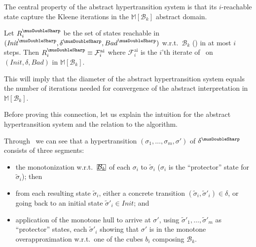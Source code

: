 \documentclass[acmsmall,screen]{acmart}
\newcommand{\Init}{{\textit{Init}}}
\newcommand{\Bad}{\textit{Bad}}
\newcommand{\tr}{\delta}
\newcommand{\Frameai}{\mathcal{F}^{\text{ai}}}
\newcommand{\bkwrch}[1]{\mathcal{B}_{#1}}
\newcommand{\absr}[1]{{#1}^{\musDoubleSharp}}
\newcommand{\madom}[1]{\mathbb{M}[{#1}]}
\newcommand{\bkcube}{b}
\newcommand\mathbox[1]{\mathord{\ThisStyle{%
  \fboxsep0\LMpt\relax\kern1\LMpt\fbox{$\SavedStyle#1$}\kern1\LMpt}}}
\newcommand{\cubejoin}[1]{\mathbox{#1}}
\begin{document}
The central property of the abstract hypertransition system is that its $i$-reachable state capture the Kleene iterations in the $\madom{\bkwrch{k}}$ abstract domain.
\begin{lemma}
\label{thm:hyperabsract-reach}
%
Let $\absr{R}_i$ be the set of states reachable in $(\absr{\Init},\absr{\tr},\absr{Bad})$ w.r.t.\ $\bkwrch{k}$ () in at most $i$ steps.
Then $\absr{R}_i \equiv \Frameai_{i}$ where $\Frameai_{i}$ is the $i$'th iterate of~ on $(\Init,\tr,\Bad)$ in $\madom{\bkwrch{k}}$.
%
%
\end{lemma}
%
%
This will imply that the diameter of the abstract hypertransition system equals the number of iterations needed for convergence of the abstract interpretation in $\madom{\bkwrch{k}}$.

Before proving this connection, let us explain the intuition for the abstract hypertransition system and the relation to the algorithm.

Through~ we can see that a hypertransition $(\sigma_1,\ldots,\sigma_m,\sigma')$ of $\absr{\tr}$ consists of three segments:
\begin{itemize}
	\item the monotonization w.r.t.\ $\cubejoin{\bkwrch{k}}$ of each $\sigma_i$ to $\widetilde{\sigma}_i$ ($\sigma_i$ is the ``protector'' state for $\widetilde{\sigma}_i$); then
	\item from each resulting state $\widetilde{\sigma}_i$, either a concrete transition $(\widetilde{\sigma}_i,\widetilde{\sigma}'_i) \in \tr$, or going back to an initial state $\widetilde{\sigma}'_i \in \Init$; and
	\item application of the monotone hull to arrive at $\sigma'$, using $\widetilde{\sigma}'_1,\ldots,\widetilde{\sigma}'_m$ as ``protector'' states, each $\widetilde{\sigma}'_i$ showing that $\sigma'$ is in the monotone overapproximation w.r.t.\ one of the cubes $\bkcube_i$ composing $\bkwrch{k}$.
\end{itemize}
\end{document}

